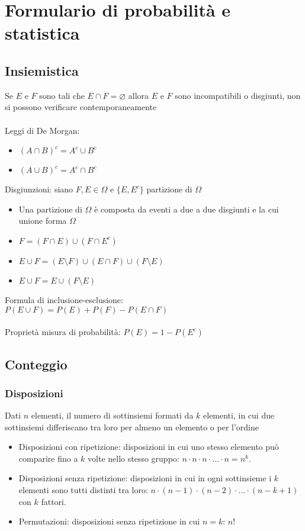 \documentclass[10pt,a4paper]{article}
\begin{document}
\section*{Formulario di probabilità e statistica}
\setlength{\columnseprule}{0.5pt}
\def\columnseprulecolor{\color{black}}

\begin{multicols}{2}
\setlength{\columnsep}{0.5cm}

\subsection*{Insiemistica}
Se $E$ e $F$ sono tali che $E \cap F= \varnothing $ allora $E$ e $F$ sono incompatibili o disgiunti, non si possono verificare contemporaneamente\\\\
Leggi di De Morgan:
\begin{itemize}
	\item $(A \cap B)^c = A^c \cup B^c$
	\item $(A \cup B)^c = A^c \cap B^c$
\end{itemize}
Disgiunzioni: siano $F, E \in \Omega$ e $\{E,E^c\}$ partizione di $\Omega$
\begin{itemize}
    \item Una partizione di $\Omega$ è composta da eventi a due a due disgiunti e la cui unione forma $\Omega$
    \item $F=(F \cap E) \cup (F \cap E^c)$
    \item $E \cup F = (E \setminus F) \cup (E \cap F) \cup (F \setminus E)$
    \item $E \cup F = E \cup (F \setminus E)$
\end{itemize}
Formula di inclusione-esclusione: \\
$P(E \cup F) = P(E) + P(F) - P(E \cap F)$\\\\
Proprietà misura di probabilità: $P(E)=1-P(E^c)$
\subsection*{Conteggio}
\subsubsection*{Disposizioni}
Dati $n$ elementi, il numero di sottinsiemi formati da $k$ elementi, in cui due sottinsiemi differiscano tra loro per almeno un elemento o per l'ordine
\begin{itemize}
	\item Disposizioni con ripetizione: disposizioni in cui uno stesso elemento può comparire fino a $k$ volte nello stesso gruppo: $n\cdot n\cdot n\cdot...\cdot n = n^k$.
	\item Disposizioni senza ripetizione: disposizioni in cui in ogni sottinsieme i $k$ elementi sono tutti distinti tra loro: $ n \cdot (n-1)\cdot (n-2) \cdot ... \cdot (n-k+1)$ con $k$ fattori.
	\item Permutazioni: disposizioni senza ripetizione in cui $n=k$: $n!$
\end{itemize}

\end{multicols}
\end{document}
